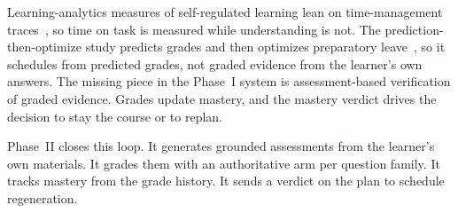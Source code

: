 Learning-analytics measures of self-regulated learning lean on time-management traces~\cite{alhazbi2024}, so time on task is measured while understanding is not. The prediction-then-optimize study predicts grades and then optimizes preparatory leave~\cite{islam2024}, so it schedules from predicted grades, not graded evidence from the learner's own answers. The missing piece in the Phase~I system is assessment-based verification of graded evidence. Grades update mastery, and the mastery verdict drives the decision to stay the course or to replan.

Phase~II closes this loop. It generates grounded assessments from the learner's own materials. It grades them with an authoritative arm per question family. It tracks mastery from the grade history. It sends a verdict on the plan to schedule regeneration.


